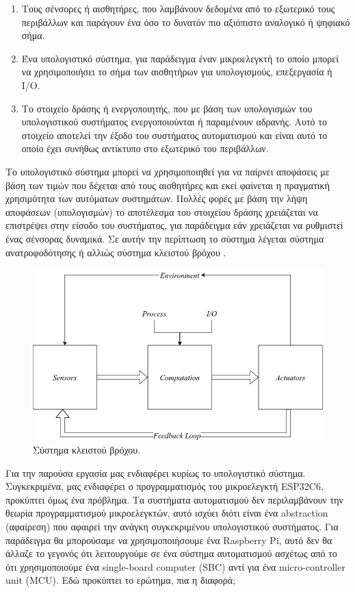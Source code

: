 \begin{enumerate}
\item Τους σένσορες ή αισθητήρες, που λαμβάνουν δεδομένα από το
εξωτερικό τους περιβάλλων και παράγουν ένα όσο το δυνατόν πιο
αξιόπιστο αναλογικό ή ψηφιακό σήμα.
\item Ένα υπολογιστικό σύστημα, για παράδειγμα έναν μικροελεγκτή το
οποίο μπορεί να χρησιμοποιήσει το σήμα των αισθητήρων για
υπολογισμούς, επεξεργασία ή I/O.
\item Το στοιχείο δράσης ή ενεργοποιητής, που με βάση των υπολογισμών
του υπολογιστικού συστήματος ενεργοποιούνται ή παραμένουν
αδρανής. Αυτό το στοιχείο αποτελεί την έξοδο του συστήματος
αυτοματισμού και είναι αυτό το οποίο έχει συνήθως αντίκτυπο στο
εξωτερικό του περιβάλλων.
\end{enumerate}

Το υπολογιστικό σύστημα μπορεί να χρησιμοποιηθεί για να παίρνει
αποφάσεις με βάση των τιμών που δέχεται από τους αισθητήρες και εκεί
φαίνεται η πραγματική χρησιμότητα των αυτόματων συστημάτων. Πολλές
φορές με βάση την λήψη αποφάσεων (υπολογισμών) το αποτέλεσμα του
στοιχείου δράσης χρειάζεται να επιστρέψει στην είσοδο του συστήματος,
για παράδειγμα εάν χρειάζεται να ρυθμιστεί ένας σένσορας δυναμικά. Σε
αυτήν την περίπτωση το σύστημα λέγεται σύστημα ανατροφοδότησης ή
αλλιώς σύστημα κλειστού βρόχου .

\begin{figure}[h!]
\centering
\includegraphics[scale=0.4]{images/introduction/as_feedback.png}
\caption{Σύστημα κλειστού βρόχου.}
 \label{fig:as_feedback}
\end{figure}

Για την παρούσα εργασία μας ενδιαφέρει κυρίως το υπολογιστικό
σύστημα. Συγκεκριμένα, μας ενδιαφέρει ο προγραμματισμός του
μικροελεγκτή ESP32C6, προκύπτει όμως ένα πρόβλημα. Τα συστήματα
αυτοματισμού δεν περιλαμβάνουν την θεωρία προγραμματισμού
μικροελεγκτών, αυτό ισχύει διότι είναι ένα abstraction (αφαίρεση) που
αφαιρεί την ανάγκη συγκεκριμένου υπολογιστικού συστήματος.  Για
παράδειγμα θα μπορούσαμε να χρησιμοποιήσουμε ένα Raspberry Pi, αυτό
δεν θα άλλαζε το γεγονός ότι λειτουργούμε σε ένα σύστημα αυτοματισμού
ασχέτως από το ότι χρησιμοποιούμε ένα single-board computer (SBC) αντί
για ένα micro-controller unit (MCU). Εδώ προκύπτει το ερώτημα, πια η
διαφορά;


